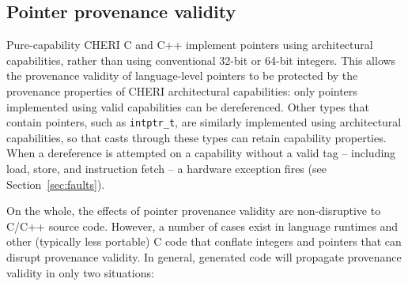 \documentclass[11pt]{article}
\newcommand{\intptr}{\texttt{intptr\_t}\xspace}
\newcommand{\note}[2]{{\color{blue}[ Note: #1 - #2]}}
\renewcommand{\note}[2]{}
\newcommand{\rwnote}[1]{\note{#1}{Robert W.}}
\begin{document}
\rwnote{We've opted to use the term ``hardware exception'' throughout, and
  mention ``traps'' only here.  This could cause confusion with respect to C++
  exceptions .. but perhaps less so than if we used the word ``exception''
  unadorned.}

\subsection{Pointer provenance validity}
\label{sec:pointer_provenance_validity}

Pure-capability CHERI C and C++ implement pointers using architectural
capabilities, rather than using conventional 32-bit or 64-bit integers.
This allows the provenance validity of language-level pointers to be
protected by the provenance properties of CHERI architectural capabilities:
only pointers implemented using valid capabilities can be dereferenced.
Other types that contain pointers, such as \intptr, are similarly implemented
using architectural capabilities, so that casts through these types
can retain capability properties.
When a dereference is attempted on a capability without a valid tag --
including load, store, and instruction fetch -- a hardware exception fires
(see Section~\ref{sec:faults}).

On the whole, the effects of pointer provenance validity are non-disruptive to
C/C++ source code.
However, a number of cases exist in language runtimes and other
(typically less portable) C code that conflate integers and pointers that can
disrupt provenance validity.
In general, generated code will propagate provenance validity in only two
situations:
\end{document}
